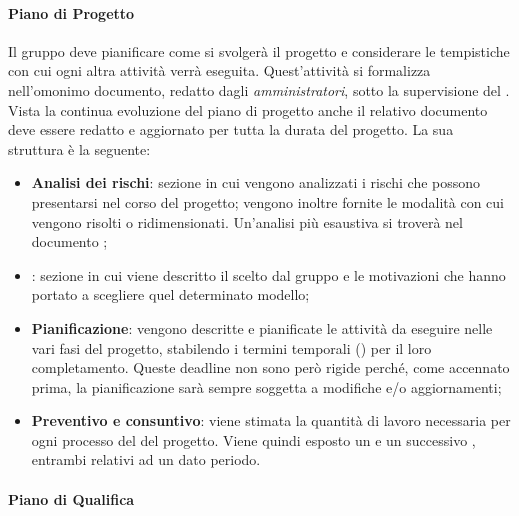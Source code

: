 \paragraph{Piano di Progetto}
\label{par:pdp}

Il gruppo deve pianificare come si svolgerà il progetto e considerare le tempistiche con cui ogni altra attività verrà 
eseguita. Quest'attività si formalizza nell'omonimo documento, redatto dagli \emph{amministratori}, sotto la 
supervisione del \emph{}. Vista la continua evoluzione del piano di progetto anche 
il relativo documento deve essere redatto e aggiornato per tutta la durata del progetto. La sua struttura è la seguente:
\begin{itemize}
    \item \textbf{Analisi dei rischi}: sezione in cui vengono analizzati i rischi che possono presentarsi nel corso del 
    progetto; vengono inoltre fornite le modalità con cui vengono risolti o ridimensionati. Un'analisi più esaustiva 
    si troverà nel documento ;
    \item \textbf{}: sezione in cui viene descritto il  
    scelto dal gruppo e le motivazioni che hanno portato a scegliere quel determinato modello;
    \item \textbf{Pianificazione}: vengono descritte e pianificate le attività da eseguire nelle vari fasi del progetto, 
    stabilendo i termini temporali () per il loro completamento. Queste deadline non sono però 
    rigide perché, come accennato prima, la pianificazione sarà sempre soggetta a modifiche e/o aggiornamenti;
    \item \textbf{Preventivo e consuntivo}: viene stimata la quantità di lavoro necessaria per ogni processo del 
     del progetto. Viene quindi esposto un  e un successivo 
    , entrambi relativi ad un dato periodo.
\end{itemize}

\paragraph{Piano di Qualifica}

